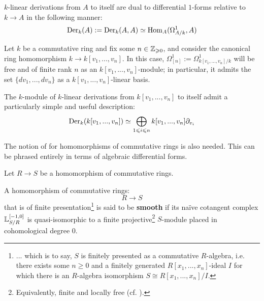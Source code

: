         \begin{corollary}
            $k$-linear derivations from $A$ to itself are dual to differential $1$-forms relative to $k \to A$ in the following manner:
                $$\mathrm{Der}_k(A) := \mathrm{Der}_k(A, A) \simeq \mathrm{Hom}_A(\Omega^1_{A/k}, A)$$
        \end{corollary}
        \begin{lemma}
            \cite[\href{https://stacks.math.columbia.edu/tag/00RX}{Tag 00RX}]{stacks} Let $k$ be a commutative ring and fix some $n \in \mathbb{Z}_{\geqslant 0}$, and consider the canonical ring homomorphism $k \to k[v_1, ..., v_n]$. In this case, $\Omega^1_{[n]} := \Omega^1_{k[v_1, ..., v_n]/k}$ will be free and of finite rank $n$ as an $k[v_1, ..., v_n]$-module; in particular, it admits the set $\{dv_1, ..., dv_n\}$ as a $k[v_1, ..., v_n]$-linear basis.
        \end{lemma}
        \begin{corollary}
            The $k$-module of $k$-linear derivations from $k[v_1, ..., v_n]$ to itself admit a particularly simple and useful description:
                $$\mathrm{Der}_k(k[v_1, ..., v_n]) \simeq \bigoplus_{1 \leqslant i \leqslant n} k[v_1, ..., v_n] \partial_{v_i}$$
        \end{corollary}

        The notion of  for homomorphisms of commutative rings is also needed. This can be phrased entirely in terms of algebraic differential forms. 
        \begin{lemma}
            
        \end{lemma}
        \begin{definition} \label{def: naive_cotangent_complexes}
            Let $R \to S$ be a homomorphism of commutative rings. 
        \end{definition}
        \begin{definition} \label{def: smooth_ring_maps}
            A homomorphism of commutative rings:
                $$R \to S$$
            that is of finite presentation\footnote{... which is to say, $S$ is finitely presented as a commutative $R$-algebra, i.e. there exists some $n \geq 0$ and a finitely generated $R[x_1, ..., x_n]$-ideal $I$ for which there is an $R$-algebra isomorphism $S \cong R[x_1, ..., x_n]/I$.} is said to be \textbf{smooth} if its na\"ive cotangent complex $\mathbb{L}^{[-1, 0]}_{S/R}$ is quasi-isomorphic to a finite projective\footnote{Equivalently, finite and locally free (cf. \cite[\href{https://stacks.math.columbia.edu/tag/00NX}{Tag 00NX}]{stacks}).} $S$-module placed in cohomological degree $0$. 
        \end{definition}

